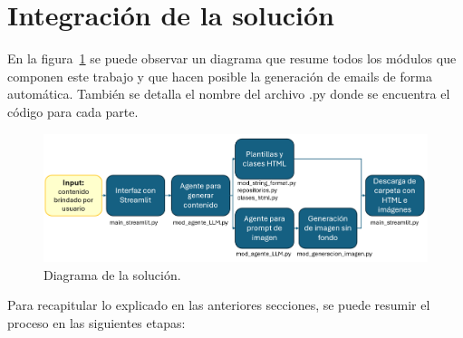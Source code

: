 
\section{Integración de la solución}

En la figura~\ref{fig:diagrama_solucion} se puede observar un diagrama que resume todos los módulos que componen este trabajo y que hacen posible la generación de emails de forma automática. También se detalla el nombre del archivo .py donde se encuentra el código para cada parte.

\begin{figure}[!htpb]
    \centering
    \includegraphics[width=\textwidth]{./Figures/diagrama_solucion_emails.png}
    \caption{Diagrama de la solución.}
    \label{fig:diagrama_solucion}
\end{figure}

Para recapitular lo explicado en las anteriores secciones, se puede resumir el proceso en las siguientes etapas:

